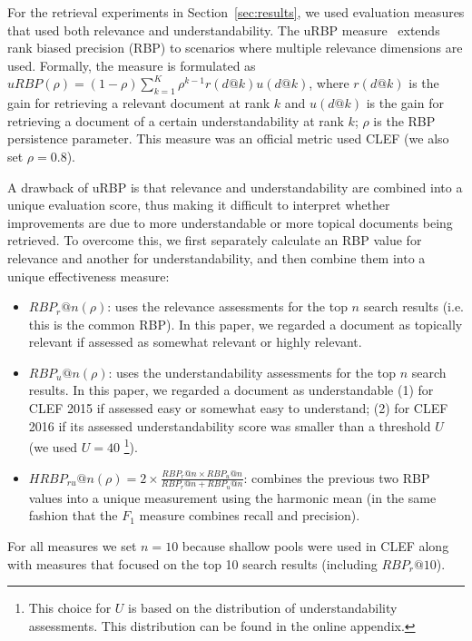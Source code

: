 
For the retrieval experiments in Section~\ref{sec:results}, we used evaluation measures that used both  relevance and understandability. The uRBP measure~\cite{zuccon2016understandability} extends rank biased precision (RBP) to scenarios where multiple relevance dimensions are used. Formally, the measure is formulated as $uRBP(\rho) = (1 - \rho) \sum_{k=1}^{K} \rho^{k-1} r(d@k) u(d@k)$, where $r(d@k)$ is the gain for retrieving a relevant document at rank $k$ and $u(d@k)$ is the gain for retrieving a document of a certain understandability at rank $k$; $\rho$ is the RBP persistence parameter. This measure was an official metric used CLEF (we also set $\rho=0.8$). 

A drawback of uRBP is that relevance and understandability are combined into a unique evaluation score, thus making it difficult to interpret whether improvements are due to more understandable or more topical documents being retrieved. To overcome this, we first separately calculate an RBP value for relevance and another for understandability, and then combine them into a unique effectiveness measure:

\begin{itemize}[leftmargin=*]
	\item $RBP_r@n(\rho)$: uses the relevance assessments for the top $n$ search results (i.e. this is the common RBP). In this paper, we regarded a document as topically relevant if assessed as somewhat relevant or highly relevant.
	
    \item $RBP_u@n(\rho)$: uses the understandability assessments for the top $n$ search results. In this paper, we regarded a document as understandable (1) for CLEF 2015 if assessed easy or somewhat easy to understand; (2) for CLEF 2016 if its assessed understandability score was smaller than a threshold $U$ (we used $U = 40$ \footnote{This choice for $U$ is based on the distribution of understandability assessments. This distribution can be found in the online appendix.}).
	
    \item $HRBP_{ru}@n(\rho) = 2 \times \frac{RBP_r@n \times RBP_u@n}{RBP_r@n + RBP_u@n}$: combines the previous two RBP values into a unique measurement using the harmonic mean (in the same fashion that the $F_1$ measure combines recall and precision).
\end{itemize}

\noindent For all measures we set $n=10$ because shallow pools were used in CLEF along with measures that focused on the top 10 search results (including $RBP_r@10$).

